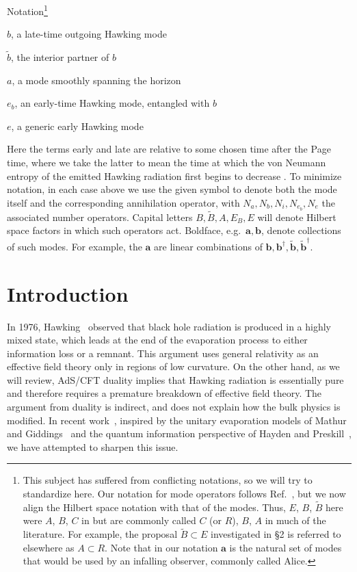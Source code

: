 \documentclass[12pt]{article}
\begin{document}
\bigskip
\centerline{\sc Notation\footnote{\label{DP}This subject has suffered from conflicting notations, so we will try to standardize here.  Our notation for mode operators follows Ref.~\cite{Almheiri:2012rt}, but we now align the Hilbert space notation with that of the modes.  Thus, $E$, $B$, $\tilde B$ here were $A$, $B$, $C$ in \cite{Almheiri:2012rt} but are commonly called $C$ (or $R$), $B$, $A$ in much of the literature.  For example, the proposal $\tilde B \subset E$ investigated in \S2 is referred to elsewhere as $A \subset R$.
Note that in our notation $\pmb a$ is the natural set of modes that would be used by an infalling observer, commonly called Alice.}}


\indent

$b$, a late-time outgoing Hawking mode

$\tilde b$, the interior partner of $b$

$a$, a mode smoothly spanning the horizon

 $e_b$, an early-time Hawking mode, entangled with $b$

 $e$, a generic early Hawking mode

Here the terms early and late are relative to some chosen time after the Page time, where we take the latter to mean the time at which the von Neumann entropy of the emitted Hawking radiation first begins to decrease \cite{Page:1993df}.  To minimize notation, in each case above we use the given symbol to denote both the mode itself and the corresponding annihilation operator, with $N_a,N_b,N_i,N_{e_b},N_e$ the associated number operators.  Capital letters $B,\tilde B, A ,E_B, E$ will denote Hilbert space factors in which such operators act.  Boldface, e.g.\ $\pmb a, \pmb b$, denote collections of such modes. For example, the $\pmb a$ are linear combinations of $\pmb b, \pmb b^\dagger, \tilde {\pmb b}, \tilde {\pmb b}^\dagger$.





\section{Introduction}

In 1976, Hawking~\cite{Hawking:1976ra} observed that black hole radiation is produced in a highly mixed state, which leads at the end of the evaporation process  to either information loss or  a remnant.  This argument uses general relativity as an effective field theory only in regions of low curvature.  On the other hand, as we will review, AdS/CFT duality implies that Hawking radiation is essentially pure and therefore requires a premature breakdown of effective field theory.  The argument from duality is indirect, and does not explain how the bulk physics is modified.  In recent work~\cite{Almheiri:2012rt}, inspired by the unitary evaporation models  of Mathur
\cite{Mathur:2009hf} and Giddings~\cite{Giddings:2011ks,Giddings:2012bm}
and the quantum information perspective of Hayden and Preskill~\cite{Hayden:2007cs}, we have attempted to sharpen this issue.
\end{document}

